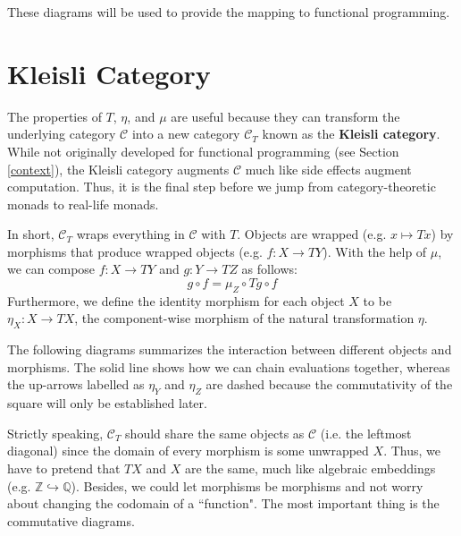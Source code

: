 \documentclass[11pt]{article}
\newcommand{\Q}{\mathbb{Q}}
\newcommand{\Z}{\mathbb{Z}}
\newcommand{\Cc}{\mathcal{C}}
\begin{document}
These diagrams will be used to provide the mapping to functional programming.

\section{Kleisli Category}
The properties of $T$, $\eta$, and $\mu$ are useful because they can transform the underlying category $\Cc$ into a new category $\Cc_T$ known as the \textbf{Kleisli category}. While not originally developed for functional programming (see Section \ref{context}), the Kleisli category augments $\Cc$ much like side effects augment computation. Thus, it is the final step before we jump from category-theoretic monads to real-life monads. 

In short, $\Cc_T$ wraps everything in $\Cc$ with $T$. Objects are wrapped (e.g. $x \mapsto Tx$) by morphisms that produce wrapped objects (e.g. $f: X \rightarrow TY$). With the help of $\mu$, we can compose $f: X \rightarrow TY$ and $g: Y \rightarrow TZ$ as follows: \[ g \circ f = \mu_Z \circ Tg \circ f\] Furthermore, we define the identity morphism for each object $X$ to be $\eta_X: X \rightarrow TX$, the component-wise morphism of the natural transformation $\eta$.

The following diagrams summarizes the interaction between different objects and morphisms. The solid line shows how we can chain evaluations together, whereas the up-arrows labelled as $\eta_Y$ and $\eta_Z$ are dashed because the commutativity of the square will only be established later.
\begin{center}
\end{center}

Strictly speaking, $\Cc_T$ should share the same objects as $\Cc$ (i.e. the leftmost diagonal) since the domain of every morphism is some unwrapped $X$. Thus, we have to pretend that $TX$ and $X$ are the same, much like algebraic embeddings (e.g. $\Z \hookrightarrow \Q$). Besides, we could let morphisms be morphisms and not worry about changing the codomain of a ``function". The most important thing is the commutative diagrams.
\end{document}
